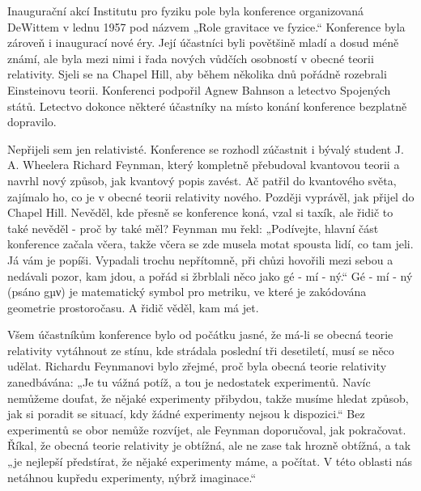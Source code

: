   Inaugurační akcí Institutu pro fyziku pole byla konference organizovaná DeWittem v lednu 1957 pod
  názvem „Role gravitace ve fyzice.“ Konference byla zároveň i inaugurací nové éry. Její účastníci
  byli povětšině mladí a dosud méně známí, ale byla mezi nimi i řada nových vůdčích osobností v
  obecné teorii relativity. Sjeli se na Chapel Hill, aby během několika dnů pořádně rozebrali
  Einsteinovu teorii. Konferenci podpořil Agnew Bahnson a letectvo Spojených států. Letectvo dokonce
  některé účastníky na místo konání konference bezplatně dopravilo. 

  Nepřijeli sem jen relativisté. Konference se rozhodl zúčastnit i bývalý student J. A. Wheelera
  Richard Feynman, který kompletně přebudoval kvantovou teorii a navrhl nový způsob, jak kvantový
  popis zavést. Ač patřil do kvantového světa, zajímalo ho, co je v obecné teorii relativity nového.
  Později vyprávěl, jak přijel do Chapel Hill. Nevěděl, kde přesně se konference koná, vzal si
  taxík, ale řidič to také nevěděl - proč by také měl? Feynman mu řekl: „Podívejte, hlavní část
  konference začala včera, takže včera se zde musela motat spousta lidí, co tam jeli. Já vám je
  popíši. Vypadali trochu nepřítomně, při chůzi hovořili mezi sebou a nedávali pozor, kam jdou, a
  pořád si žbrblali něco jako gé - mí - ný.“ Gé - mí - ný (psáno gµν) je matematický symbol pro
  metriku, ve které je zakódována geometrie prostoročasu. A řidič věděl, kam má jet.

  Všem účastníkům konference bylo od počátku jasné, že má-li se obecná teorie relativity vytáhnout
  ze stínu, kde strádala poslední tři desetiletí, musí se něco udělat. Richardu Feynmanovi bylo
  zřejmé, proč byla obecná teorie relativity zanedbávána: „Je tu vážná potíž, a tou je nedostatek
  experimentů. Navíc nemůžeme doufat, že nějaké experimenty přibydou, takže musíme hledat způsob,
  jak si poradit se situací, kdy žádné experimenty nejsou k dispozici.“ Bez experimentů se obor
  nemůže rozvíjet, ale Feynman doporučoval, jak pokračovat. Říkal, že obecná teorie relativity je
  obtížná, ale ne zase tak hrozně obtížná, a tak „je nejlepší předstírat, že nějaké experimenty
  máme, a počítat. V této oblasti nás netáhnou kupředu experimenty, nýbrž imaginace.“ 

